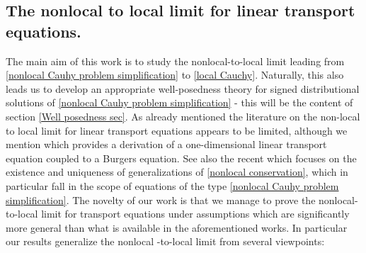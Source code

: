 \documentclass[11pt,reqno]{amsart}
\numberwithin{equation}{section}
\begin{document}
\subsection{The nonlocal to local limit for linear transport equations.} The main aim of this work is to study the nonlocal-to-local limit leading from \eqref{nonlocal Cauhy problem simplification} to \eqref{local Cauchy}. Naturally, this also leads us to develop an appropriate well-posedness theory for signed distributional solutions of \eqref{nonlocal Cauhy problem simplification} - this will be the content of section \ref{Well posedness sec}. As already mentioned the literature on the non-local to local limit for linear transport equations appears to be limited, although we mention \cite{coclite2026nonlocal} which provides a derivation of a one-dimensional linear transport equation coupled to a Burgers equation. See also the recent \cite{gong2026existence} which focuses on the existence and uniqueness of generalizations of \eqref{nonlocal conservation}, which in particular fall in the scope of equations of the type \eqref{nonlocal Cauhy problem simplification}.   The novelty of our work is that we manage to prove the nonlocal-to-local limit for transport equations under assumptions which are significantly more general than what is  available in the aforementioned works. In particular our results generalize the nonlocal -to-local limit from several  viewpoints:  
\end{document}
